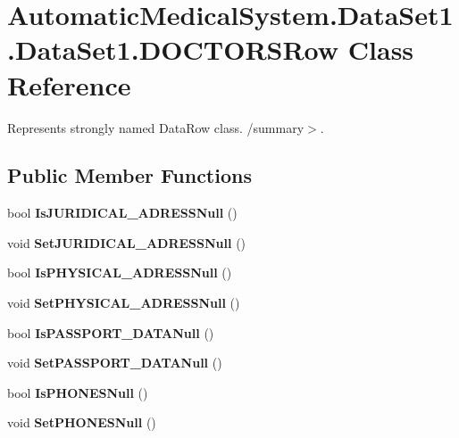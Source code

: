 \section{AutomaticMedicalSystem.DataSet1.DataSet1.DOCTORSRow Class Reference}
\label{class_automatic_medical_system_1_1_data_set1_1_1_d_o_c_t_o_r_s_row}
Represents strongly named DataRow class. /summary$>$.  


\subsection*{Public Member Functions}
\begin{CompactItemize}
\item 
bool \textbf{IsJURIDICAL\_\-ADRESSNull} ()\label{class_automatic_medical_system_1_1_data_set1_1_1_d_o_c_t_o_r_s_row_68b705cc812f0066a6eaaa2718da2ea6}

\item 
void \textbf{SetJURIDICAL\_\-ADRESSNull} ()\label{class_automatic_medical_system_1_1_data_set1_1_1_d_o_c_t_o_r_s_row_e11841a21eab5e78205aae79287d1a73}

\item 
bool \textbf{IsPHYSICAL\_\-ADRESSNull} ()\label{class_automatic_medical_system_1_1_data_set1_1_1_d_o_c_t_o_r_s_row_a9a40074eb423ad8816758b2f4db9780}

\item 
void \textbf{SetPHYSICAL\_\-ADRESSNull} ()\label{class_automatic_medical_system_1_1_data_set1_1_1_d_o_c_t_o_r_s_row_5c07dbabb0a77a6ad42b3d13797e0d0e}

\item 
bool \textbf{IsPASSPORT\_\-DATANull} ()\label{class_automatic_medical_system_1_1_data_set1_1_1_d_o_c_t_o_r_s_row_aef755ebbe9bbd030f8a7f89b815eb67}

\item 
void \textbf{SetPASSPORT\_\-DATANull} ()\label{class_automatic_medical_system_1_1_data_set1_1_1_d_o_c_t_o_r_s_row_a7f61be33f2cbc8f023a612aac5b4e31}

\item 
bool \textbf{IsPHONESNull} ()\label{class_automatic_medical_system_1_1_data_set1_1_1_d_o_c_t_o_r_s_row_506828285dbca485e39abb1038891f69}

\item 
void \textbf{SetPHONESNull} ()\label{class_automatic_medical_system_1_1_data_set1_1_1_d_o_c_t_o_r_s_row_0da004b0c1ac5e30ed0207154fd9b6e2}


\end{CompactItemize}
